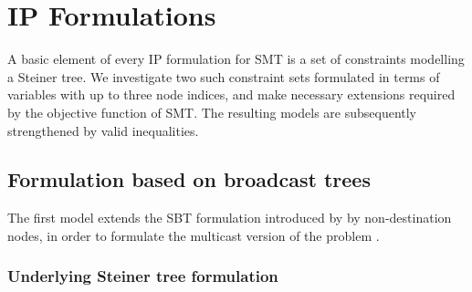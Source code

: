 \section{IP Formulations}
\label{sec:ILP}

A basic element of every IP formulation for SMT is a set of constraints modelling a Steiner tree.
We investigate two such constraint sets formulated in terms of variables with up to three node indices, and make necessary extensions required by the objective function of SMT.
The resulting models are subsequently strengthened by valid inequalities.

\subsection{Formulation based on broadcast trees}

The first model extends the SBT formulation introduced by \citet{Haugland12Dual} by non-destination nodes, in order to formulate the multicast version of the problem \citep{ivanova16isco}.

\subsubsection{Underlying Steiner tree formulation}

